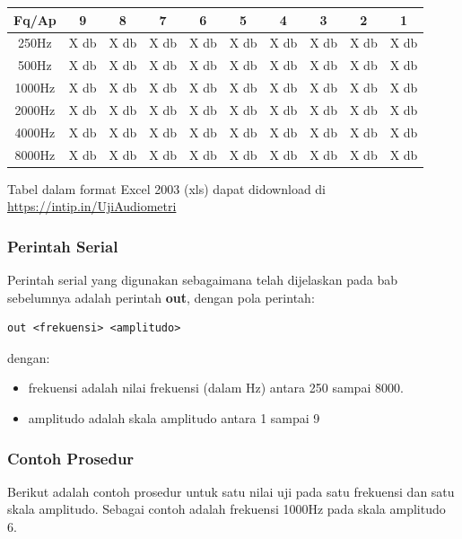 \documentclass[12pt,]{article}
\begin{document}
	\begin{center}
		\begin{tabular}{|c|c|c|c|c|c|c|c|c|c|} 
			\hline
			Fq/Ap & 9 & 8 & 7 & 6 & 5 & 4 & 3 & 2 & 1\\ [0.5ex] 
			\hline\hline
			250Hz & X db & X db & X db & X db & X db & X db & X db & X db & X db\\
			\hline
			500Hz & X db & X db & X db & X db & X db & X db & X db & X db & X db\\
			\hline
			1000Hz & X db & X db & X db & X db & X db & X db & X db & X db & X db\\
			\hline
			2000Hz & X db & X db & X db & X db & X db & X db & X db & X db & X db\\
			\hline
			4000Hz & X db & X db & X db & X db & X db & X db & X db & X db & X db\\
			\hline
			8000Hz & X db & X db & X db & X db & X db & X db & X db & X db & X db\\
			\hline
		\end{tabular}
	\end{center}
	
	Tabel dalam format Excel 2003 (xls) dapat didownload di \url{https://intip.in/UjiAudiometri}
	
	\subsubsection{Perintah Serial}
	
	Perintah serial yang digunakan sebagaimana telah dijelaskan pada bab sebelumnya adalah perintah \textbf{out},
	dengan pola perintah:
	\begin{verbatim}
out <frekuensi> <amplitudo>
	\end{verbatim}
	dengan:
	\begin{itemize}
		\item frekuensi adalah nilai frekuensi (dalam Hz) antara 250 sampai 8000.
		\item amplitudo adalah skala amplitudo antara 1 sampai 9
	\end{itemize}

	\subsubsection{Contoh Prosedur}
	
	Berikut adalah contoh prosedur untuk satu nilai uji pada satu frekuensi dan satu skala amplitudo.
	Sebagai contoh adalah frekuensi 1000Hz pada skala amplitudo 6.
	
\end{document}
